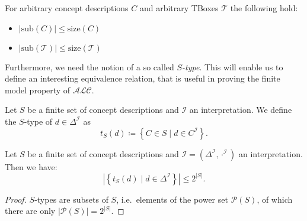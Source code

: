 
\begin{lemma} \label{lem:card(sub)<=size}
	For arbitrary concept descriptions $C$ and arbitrary TBoxes $ \mathcal{T}$ the following hold:
	\begin{itemize}
		\item $\left| \text{sub}(C) \right| \leq \text{size}(C)$ 
		\item $\left| \text{sub}(\mathcal{T}) \right| \leq \text{size}(\mathcal{T})$
	\end{itemize}
\end{lemma}

Furthermore, we need the notion of a so called \textit{$S$-type}.
This will enable us to define an interesting equivalence relation, that is useful in proving the finite model property of $\mathcal{ALC}$.
\begin{definition}[$S$-type]
	Let $S$ be a finite set of concept descriptions and $\mathcal{I}$ an interpretation.
	We define the $S$-type of $d \in \Delta^{\mathcal{I}}$ as
	\[
		t_S(d) \coloneqq \left\{ C \in S \mid d \in C^{\mathcal{I}} \right\}
	.\]
\end{definition}

\begin{lemma}\label{lem:number of s-types}
	Let $S$ be a finite set of concept descriptions and $\mathcal{I} = (\Delta^{\mathcal{I}}, \cdot^{\mathcal{I}})$ an interpretation.
	Then we have:
	 \[
		 \left| \left\{ t_S(d) \mid d \in \Delta^{\mathcal{I}} \right\} \right| \leq 2^{\left| S \right|}
	.\]
\end{lemma}
\begin{proof}
	$S$-types are subsets of $S$, i.e.\ elements of the power set $\mathscr{P}(S)$,
	of which there are only $\lvert \mathscr{P}(S) \rvert = 2^{\lvert S \rvert}$.
\end{proof}

